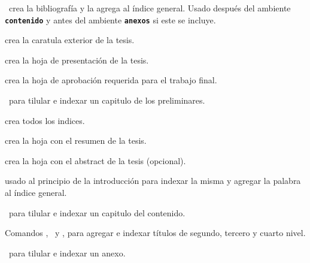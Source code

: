 
\pa\ crea la bibliografía y la agrega al índice general. Usado después del ambiente \texttt{\textbf{contenido}} y antes del ambiente \texttt{\textbf{anexos}} si este se incluye.


 crea la caratula exterior de la tesis.

 crea la hoja de presentación de la tesis.

 crea la hoja de aprobación requerida para el trabajo final.

\pa\ para tilular e indexar un capitulo de los preliminares.

 crea todos los indices.

 crea la hoja con el resumen de la tesis.

 crea la hoja con el abstract de la tesis (opcional).



 usado al principio de la introducción para indexar la misma y agregar la palabra  al índice general.

\pa\ para tilular e indexar un capitulo del contenido.

Comandos \pa, \pa\ y \pa, para agregar e indexar títulos de segundo, tercero y cuarto nivel.



\pa\ para tilular e indexar un anexo.

